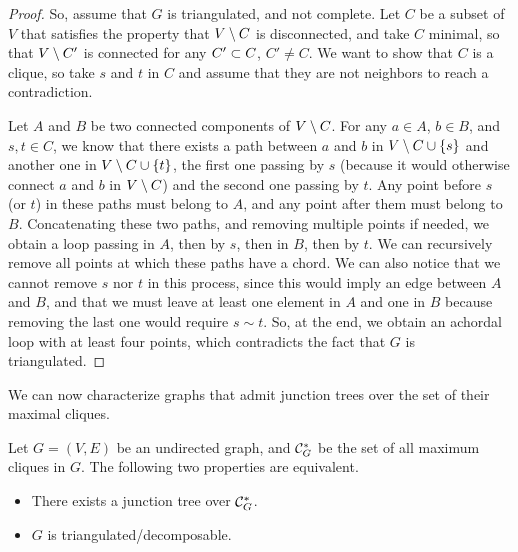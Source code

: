 \begin{proof}
So, assume that $G$ is triangulated, and not complete. Let $C$ be a subset
of $V$ that satisfies the property that $V\setminus C$ is disconnected, and take $C$ minimal, so  that $V\setminus C'$ is connected for any $C'\subset C$, $C'\neq
C$. We want to show that $C$ is a clique, so take $s$ and $t$ in $C$
and assume that they are not neighbors to reach a contradiction.

Let $A$ and $B$ be two connected components of $V\setminus C$. For any
$a\in A$,  $b\in B$, and $s,t\in C$, we know that there exists a path
between $a$ and $b$ in $V\setminus C\cup \{s\}$ and another one in $V\setminus
C \cup \{t\}$, the first one passing by $s$ (because it would
otherwise connect $a$ and $b$ in $V\setminus C$) and the second one
passing by $t$. Any point before $s$ (or $t$) in these paths must
belong to $A$, and any point after them must belong to
$B$. Concatenating these two paths, and removing multiple points if
needed, we obtain a loop passing in $A$, then by $s$, then in $B$,
then by $t$. We can recursively remove all points at which these paths
have a chord. We can also notice that we cannot remove $s$ nor $t$ in this
process, since this would imply an edge between $A$ and $B$, and that
we  must
leave at least one element in $A$ and one in $B$ because removing the
last one would require $s\sim t$. So, at the end, we obtain an achordal loop
with at least four points, which contradicts the fact that $G$ is
triangulated.
\end{proof}

We can now characterize graphs that admit junction trees over the set
of their maximal cliques.
\begin{theorem}
\label{th:jct.tree.exist}
Let $G = (V, E)$ be an undirected graph, and ${\mathcal C}^*_G$ be the set of all
maximum cliques in $G$. The following two properties are equivalent. 
\begin{itemize}
\item[(i)] There exists a junction tree over ${\mathcal C}^*_G$.
\item[(ii)] $G$ is triangulated/decomposable.
\end{itemize}
\end{theorem}

